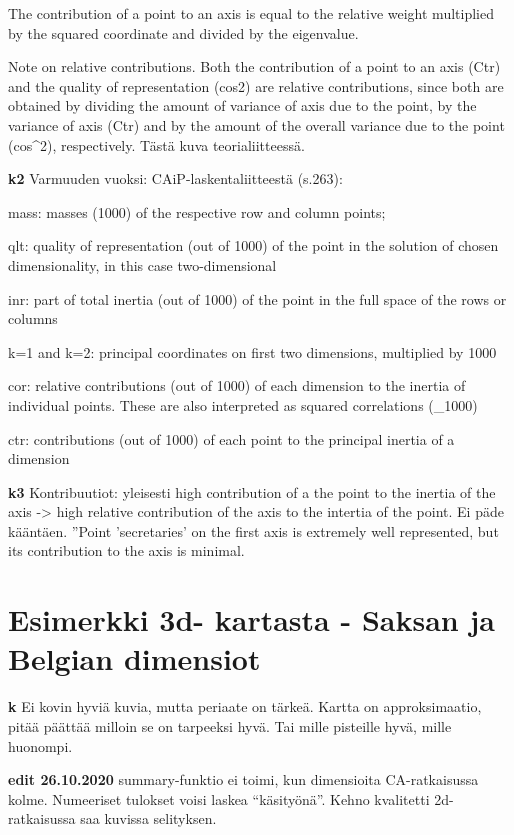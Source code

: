 \documentclass[
  finnish,
]{book}
\begin{document}
The contribution of a point to an axis is equal to the relative weight
multiplied by the squared coordinate and divided by the eigenvalue.

Note on relative contributions.
Both the contribution of a point to an axis (Ctr) and the quality of
representation (cos2) are relative contributions, since both are obtained by
dividing the amount of variance of axis due to the point, by the variance of
axis (Ctr) and by the amount of the overall variance due to the point (cos\^{}2),
respectively. Tästä kuva teorialiitteessä.

\textbf{k2} Varmuuden vuoksi: CAiP-laskentaliitteestä (s.263):

mass: masses (1000) of the respective row and column points;

qlt: quality of representation (out of 1000) of the point in the solution of
chosen dimensionality, in this case two-dimensional

inr: part of total inertia (out of 1000) of the point in the full space of the
rows or columns

k=1 and k=2: principal coordinates on first two dimensions, multiplied by 1000

cor: relative contributions (out of 1000) of each dimension to the inertia of
individual points. These are also interpreted as squared correlations (\_1000)

ctr: contributions (out of 1000) of each point to the principal inertia of a dimension

\textbf{k3} Kontribuutiot: yleisesti high contribution of a the point to the inertia of the
axis -\textgreater{} high relative contribution of the axis to the intertia of the point.
Ei päde kääntäen. ''Point 'secretaries' on the first axis is extremely
well represented, but its contribution to the axis is minimal.

\hypertarget{esimerkki-3d--kartasta---saksan-ja-belgian-dimensiot}{%
\section{Esimerkki 3d- kartasta - Saksan ja Belgian dimensiot}\label{esimerkki-3d--kartasta---saksan-ja-belgian-dimensiot}}

\textbf{k} Ei kovin hyviä kuvia, mutta periaate on tärkeä. Kartta on approksimaatio,
pitää päättää milloin se on tarpeeksi hyvä. Tai mille pisteille hyvä, mille huonompi.

\textbf{edit 26.10.2020} summary-funktio ei toimi, kun dimensioita CA-ratkaisussa kolme.
Numeeriset tulokset voisi laskea ``käsityönä''. Kehno kvalitetti 2d-ratkaisussa saa
kuvissa selityksen.
\end{document}

